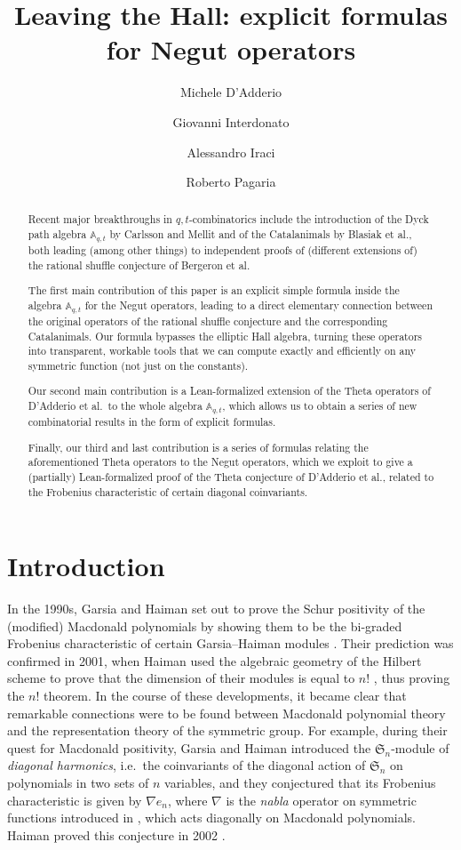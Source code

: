 \documentclass[reqno]{amsart}
\title{Leaving the Hall: explicit formulas for Negut operators}
\author{Michele D'Adderio}
\author{Giovanni Interdonato}
\author{Alessandro Iraci}
\author{Roberto Pagaria}
\theoremstyle{plain}
\theoremstyle{definition}
\theoremstyle{remark}
\newcommand{\A}{\mathbb{A}}%
\newcommand{\<}{\langle}
\renewcommand{\>}{\rangle}
\begin{document}
\begin{abstract}
    Recent major breakthroughs in $q,t$-combinatorics include the introduction of the Dyck path algebra $\A_{q,t}$ by Carlsson and Mellit and of the Catalanimals by Blasiak et al., both leading (among other things) to independent proofs of (different extensions of) the rational shuffle conjecture of Bergeron et al.

    The first main contribution of this paper is an explicit simple formula inside the algebra $\A_{q,t}$ for the Negut operators, leading to a direct elementary connection between the original operators of the rational shuffle conjecture and the corresponding Catalanimals. Our formula bypasses the elliptic Hall algebra, turning these operators into transparent, workable tools that we can compute exactly and efficiently on any symmetric function (not just on the constants).

    Our second main contribution is a Lean-formalized extension of the Theta operators of D'Adderio et al.\ to the whole algebra $\A_{q,t}$, which allows us to obtain a series of new combinatorial results in the form of explicit formulas.

    Finally, our third and last contribution is a series of formulas relating the aforementioned Theta operators to the Negut operators, which we exploit to give a (partially) Lean-formalized proof of the Theta conjecture of D'Adderio et al., related to the Frobenius characteristic of certain diagonal coinvariants.
\end{abstract}

\maketitle
\tableofcontents

\section{Introduction}

In the 1990s, Garsia and Haiman set out to prove the Schur positivity of the (modified) Macdonald polynomials by showing them to be the bi-graded Frobenius characteristic of certain Garsia--Haiman modules \cite{GarsiaHaiman1993GradedRepresentationModel}. Their prediction was confirmed in 2001, when Haiman used the algebraic geometry of the Hilbert scheme to prove that the dimension of their modules is equal to $n!$ \cite{Haiman2001nFactorial}, thus proving the $n!$ theorem. In the course of these developments, it became clear that remarkable connections were to be found between Macdonald polynomial theory and the representation theory of the symmetric group. For example, during their quest for Macdonald positivity, Garsia and Haiman introduced the $\mathfrak{S}_n$-module of \emph{diagonal harmonics}, i.e.\ the coinvariants of the diagonal action of $\mathfrak{S}_n$ on polynomials in two sets of $n$ variables, and they conjectured that its Frobenius characteristic is given by $\nabla e_n$, where $\nabla$ is the \emph{nabla} operator on symmetric functions introduced in \cite{BergeronGarsiaHaimanTesler1999IdentitiesPositivityConjectures}, which acts diagonally on Macdonald polynomials. Haiman proved this conjecture in 2002 \cite{Haiman2002HilbertScheme}.
\end{document}
